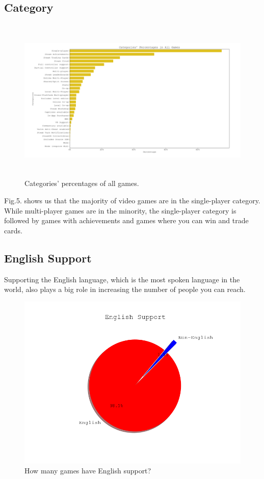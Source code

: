 \documentclass[conference]{IEEEtran}
\begin{document}
\subsection{Category}
\begin{figure}[h]
  \centering
  \includegraphics[width=\linewidth,height=7.9cm]{assets-1/categories_dist.png}
  \caption{Categories' percentages of all games.}
  \label{fig:category1}
\end{figure}

Fig.5. shows us that the majority of video games are in the single-player category. While multi-player games are in the minority, the single-player category is followed by games with achievements and games where you can win and trade cards.

\subsection{English Support}

Supporting the English language, which is the most spoken language in the world, also plays a big role in increasing the number of people you can reach. 

\begin{figure}[ht]
  \centering
  \includegraphics[width=\linewidth]{assets-1/english_support_pie.png}
  \caption{How many games have English support?}
  \label{fig:englishsupport1}
\end{figure}
\end{document}

